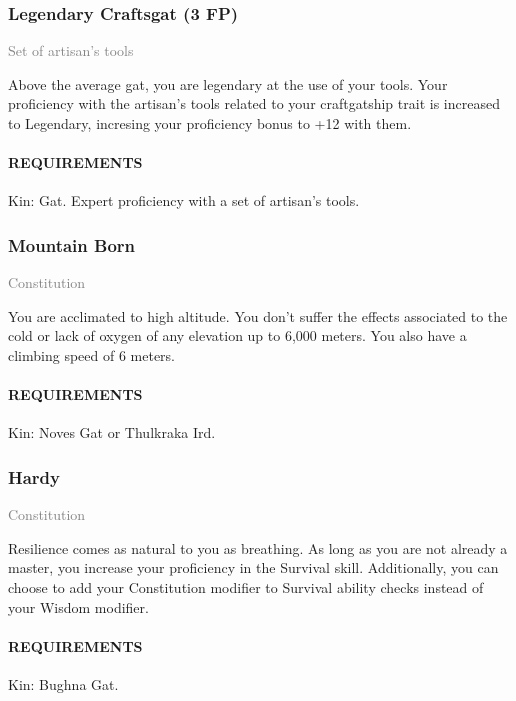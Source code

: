        \subsubsection{Legendary Craftsgat (3 FP)} \label{feat::legendarycraftsgat}
        \small{\textcolor{gray}{Set of artisan's tools}}

        \normalsize
        Above the average gat, you are legendary at the use of your tools.
        Your proficiency with the artisan's tools related to your craftgatship trait is increased to Legendary, incresing your proficiency bonus to +12 with them.
        \paragraph{REQUIREMENTS} Kin: Gat. Expert proficiency with a set of artisan's tools.

        \subsubsection{Mountain Born} \label{feat::mountainborn}
        \small{\textcolor{gray}{Constitution}}

        \normalsize
        You are acclimated to high altitude.
        You don't suffer the effects associated to the cold or lack of oxygen of any elevation up to 6,000 meters.
        You also have a climbing speed of 6 meters.
        \paragraph{REQUIREMENTS} Kin: Noves Gat or Thulkraka Ird.

        \subsubsection{Hardy} \label{feat::hardy}
        \small{\textcolor{gray}{Constitution}}

        \normalsize
        Resilience comes as natural to you as breathing.
        As long as you are not already a master, you increase your proficiency in the Survival skill.
        Additionally, you can choose to add your Constitution modifier to Survival ability checks   instead of your Wisdom modifier.
        \paragraph{REQUIREMENTS} Kin: Bughna Gat.


